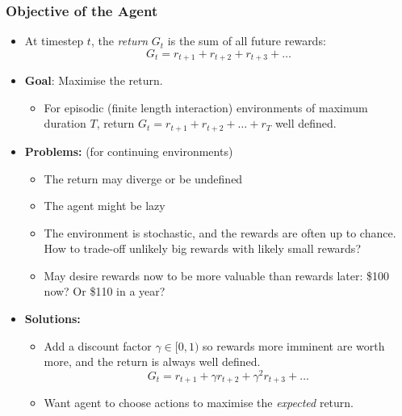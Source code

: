 \documentclass[10pt,a4paper]{beamer}
\begin{document}
\begin{frame}
	\frametitle{Objective of the Agent}
	
	\begin{itemize}
		\item At timestep $t$, the \textit{return} $G_t$ is the sum
		of all future rewards:
		$$
		G_t = r_{t+1} + r_{t+2} + r_{t+3} + \ldots 
		$$
		\pause
        \vspace{-0.6cm}
		\item \textbf{Goal}: Maximise the return.
		\pause
		\begin{itemize}
			\item For episodic  
			(finite length interaction) environments of maximum duration $T$,
			return $G_t = r_{t+1} + r_{t+2} + \ldots + r_T$ well defined.   
		\end{itemize}
		\pause
		\item \textbf{Problems:} (for continuing environments)
		\begin{itemize}
			\item The return may diverge or be undefined
            \pause
			\item The agent might be lazy
            \pause
			\item The environment is stochastic, and the rewards are often
			up to chance. How to trade-off unlikely big rewards with
			likely small rewards?
            \pause
			\item May desire rewards now to be more valuable than rewards later:
			\$100 now? Or \$110 in a year?
		\end{itemize}
		\pause
		\item \textbf{Solutions:} 
		\begin{itemize}
			\item Add a discount factor $\gamma \in [0, 1)$
			so rewards more imminent are worth more, and the
			return is always well defined.
			$$
			G_t = r_{t+1} + \gamma r_{t+2} + \gamma^2 r_{t+3} + \ldots 
			$$
			\item Want agent to choose actions to
			maximise the \textit{expected} return.
		\end{itemize}
		
	\end{itemize}
\end{frame}
\end{document}
